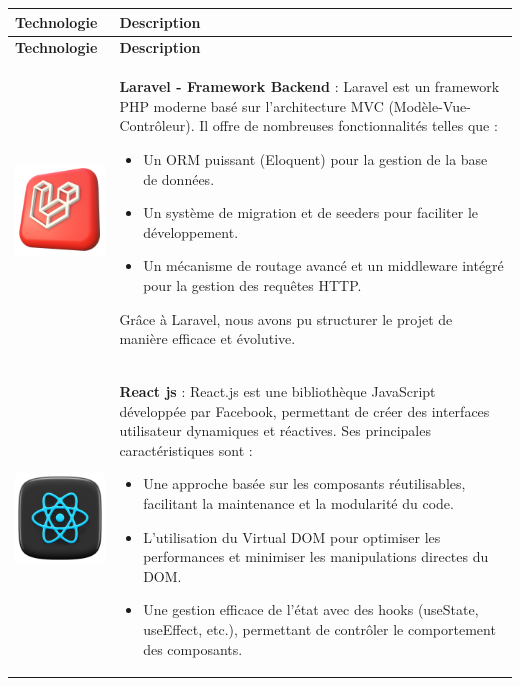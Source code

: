 \vspace{1cm} %


\begin{longtable}{|m{4cm}|m{10cm}|}
    \hline
    \textbf{Technologie} & \textbf{Description} \\
    \hline
    \endfirsthead

    \hline
    \textbf{Technologie} & \textbf{Description} \\
    \hline
    \endhead

    \hline
    \endfoot

    \hline
    \includegraphics[width=3cm]{images/logo/laravel.png} & 
    \textbf{Laravel - Framework Backend} : Laravel est un framework PHP moderne basé sur l’architecture MVC (Modèle-Vue-Contrôleur). Il offre de nombreuses fonctionnalités telles que :  
    \begin{itemize}
        \item Un ORM puissant (Eloquent) pour la gestion de la base de données.
        \item Un système de migration et de seeders pour faciliter le développement.
        \item Un mécanisme de routage avancé et un middleware intégré pour la gestion des requêtes HTTP.
    \end{itemize}
    Grâce à Laravel, nous avons pu structurer le projet de manière efficace et évolutive. \\
    \hline

    \includegraphics[width=3cm]{images/logo/react.png} & 
    \textbf{React js} : React.js est une bibliothèque JavaScript développée par Facebook, permettant de créer des interfaces utilisateur dynamiques et réactives. Ses principales caractéristiques sont :
    \begin{itemize}
        \item Une approche basée sur les composants réutilisables, facilitant la maintenance et la modularité du code.
\item L'utilisation du Virtual DOM pour optimiser les performances et minimiser les manipulations directes du DOM.
\item Une gestion efficace de l'état avec des hooks (useState, useEffect, etc.), permettant de contrôler le comportement des composants.
    \end{itemize}\\
    \hline


\end{longtable}
